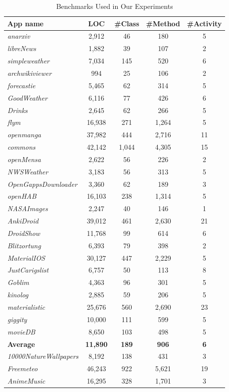 \documentclass[sigconf,review, anonymous]{acmart}
\begin{document}
\begin{table}[t!]
\centering
\footnotesize
\caption{Benchmarks Used in Our Experiments}
\begin{tabular}{|l|c|c|c|c|}\hline
{\bf App name}&{\bf LOC}&{\bf \#Class}&{\bf \#Method}&{\bf \#Activity}
\\\hline
\hline
{\it anarxiv}&2,912&46&180&5
\\
{\it libreNews}&1,882&39&107&2
\\
{\it simpleweather}&7,034&145&520&6
\\
{\it archwikiviewer}&994&25&106&2
\\
{\it forecastie}&5,465&62&314&5
\\
{\it GoodWeather}&6,116&77&426&6
\\
{\it Drinks}&2,645&62&266&5
\\
{\it flym}&16,938&271&1,264&5
\\
{\it openmanga}&37,982&444&2,716&11
\\
{\it commons}&42,142&1,044&4,305&15
\\
{\it openMensa}&2,622&56&226&2
\\
{\it NWSWeather}&3,183&56&313&5
\\
{\it OpenGappsDownloader}&3,360&62&189&3
\\
{\it openHAB}&16,103&238&1,314&5
\\
{\it NASAImages}&2,247&40&146&1
\\
{\it AnkiDroid}&39,012&461&2,630&21
\\
{\it DroidShow}&11,768&99&614&6
\\
{\it Blitzortung}&6,393&79&398&2
\\
{\it MaterialIOS}&30,127&447&2,229&5
\\
{\it JustCarigslist}&6,757&50&113&8
\\
{\it Goblim}&4,363&96&301&5
\\
{\it kinolog}&2,885&59&206&5
\\
{\it materialistic}&25,676&560&2,690&23
\\
{\it giggity}&10,000&111&599&5
\\
{\it movieDB}&8,650&103&498&5
\\\hline
{\bf Average}&{\bf 11,890}&{\bf 189}&{\bf 906}&{\bf 6}
\\\hline
\hline
{\it 10000NatureWallpapers}&8,192&138&431&3
\\
{\it Freemeteo}&46,243&922&5,621&19
\\
{\it AnimeMusic}&16,295&328&1,701&3
\\

\end{tabular}
\end{table}
\end{document}

